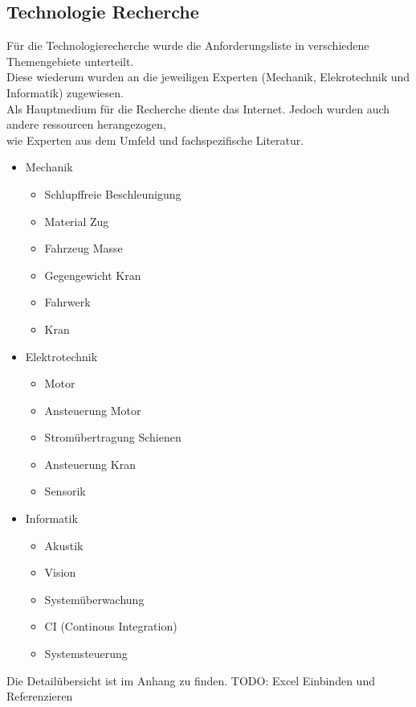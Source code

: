 \documentclass[../../main.tex]{subfiles}
\begin{document}
\subsection{Technologie Recherche}
Für die Technologierecherche wurde die Anforderungsliste in verschiedene Themengebiete unterteilt. \\
Diese wiederum wurden an die jeweiligen Experten (Mechanik, Elekrotechnik und Informatik) zugewiesen. \\
Als Hauptmedium für die Recherche diente das Internet. Jedoch wurden auch andere ressourcen herangezogen, \\
wie Experten aus dem Umfeld und fachspezifische Literatur.

\begin{itemize}
    \item Mechanik
    \begin{itemize}
        \item Schlupffreie Beschleunigung
        \item Material Zug
        \item Fahrzeug Masse
        \item Gegengewicht Kran
        \item Fahrwerk
        \item Kran
    \end{itemize}
    \item Elektrotechnik
    \begin{itemize}
        \item Motor
        \item Ansteuerung Motor
        \item Stromübertragung Schienen
        \item Ansteuerung Kran
        \item Sensorik
      \end{itemize}
    \item Informatik
    \begin{itemize}
        \item Akustik
        \item Vision
        \item Systemüberwachung
        \item CI (Continous Integration)
        \item Systemsteuerung
    \end{itemize}
\end{itemize}


Die Detailübersicht ist im Anhang zu finden. TODO: Excel Einbinden und Referenzieren
\end{document}
